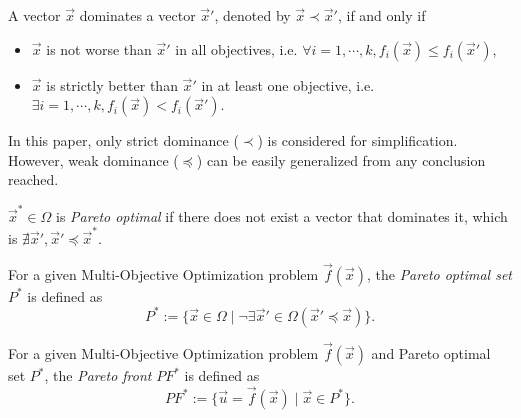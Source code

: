 \documentclass[12pt]{article}
\begin{document}
\begin{mydef}
\label{def:pareto_dom}
A vector $ \vec{x} $ dominates a vector $ \vec{x}' $, denoted by $ \vec{x} \prec \vec{x}' $, if and only if 
\begin{itemize}
\item $ \vec{x} $ is not worse than $ \vec{x}' $ in all objectives, i.e. $ \forall i = 1, \cdots, k, f_{i}(\vec{x}) \leq f_{i}(\vec{x}') $, 
\item $ \vec{x} $ is strictly better than $ \vec{x}' $ in at least one objective, i.e. $ \exists i = 1, \cdots , k, f_{i}(\vec{x}) < f_{i}(\vec{x}') $. 
\end{itemize}
\end{mydef}

\begin{prop}
In this paper, only strict dominance ($ \prec $) is considered for simplification. However, weak dominance ($ \preceq $) can be easily generalized from any conclusion reached.
\end{prop}

\begin{mydef}
\label{def:pareto_opt}
$ \vec{x}^{*} \in \Omega $ is \emph{Pareto optimal} if there does not exist a vector that dominates it, which is $ \nexists \vec{x}', \vec{x}' \preceq \vec{x}^{*} $.
\end{mydef}


\begin{mydef}
\label{def:pareto_opt_set}
For a given Multi-Objective Optimization problem $ \vec{f}(\vec{x}) $, the \emph{Pareto optimal set} $ P^{*} $ is defined as
\begin{equation}
\label{eq:pa_opt_set}
P^{*} := \{ \vec{x} \in \Omega \mid \neg \exists \vec{x}' \in \Omega (\vec{x}' \preceq \vec{x}) \}.
\end{equation}

\end{mydef}

\begin{mydef}
\label{def:pareto_front}
For a given Multi-Objective Optimization problem $ \vec{f}(\vec{x}) $ and Pareto optimal set $ P^{*} $, the \emph{Pareto front} $ PF^{*} $ is defined as
\begin{equation}
\label{eq:pa_front}
PF^{*} := \{ \vec{u} = \vec{f}(\vec{x}) \mid \vec{x} \in P^{*}  \}.
\end{equation}
\end{mydef}
\end{document}
